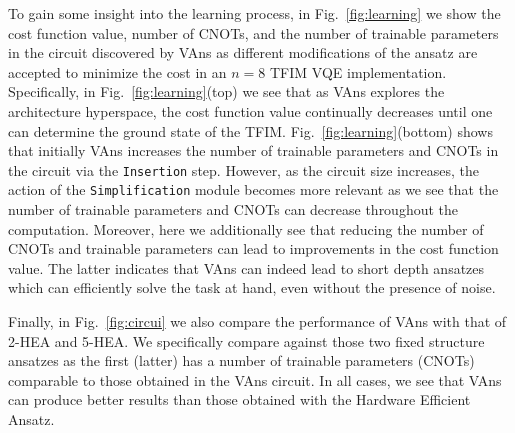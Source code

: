 To gain some insight into the learning process, in Fig.~\ref{fig:learning} we show the cost function value, number of CNOTs, and the number of trainable parameters in the circuit discovered by VAns as different modifications of the ansatz are accepted to minimize the cost in an $n=8$ TFIM VQE implementation. Specifically, in Fig.~\ref{fig:learning}(top) we see that as VAns explores the architecture hyperspace, the cost function value continually decreases until one can determine the ground state of the TFIM. Fig.~\ref{fig:learning}(bottom) shows that initially VAns increases the number of trainable parameters and CNOTs in the circuit via the \texttt{Insertion} step. However, as the circuit size increases, the action of the \texttt{Simplification} module becomes more relevant as we see that the number of trainable parameters and CNOTs can decrease throughout the computation. Moreover, here we additionally see that reducing the number of CNOTs and trainable parameters can lead to improvements in the cost function value. The latter indicates that VAns can indeed lead to short depth ansatzes which can efficiently solve the task at hand, even without the presence of noise.

Finally, in Fig.~\ref{fig:circui} we also compare the performance of VAns with that of 2-HEA and 5-HEA. We specifically compare against those two fixed structure ansatzes as the first (latter) has a number of trainable parameters (CNOTs) comparable to those obtained in the VAns circuit. In all cases, we see that VAns can produce better results than those obtained with the Hardware Efficient Ansatz.



